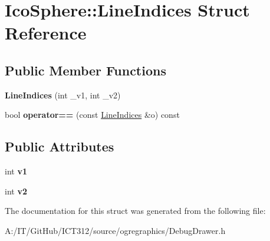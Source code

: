 \hypertarget{struct_ico_sphere_1_1_line_indices}{\section{Ico\-Sphere\-:\-:Line\-Indices Struct Reference}
\label{struct_ico_sphere_1_1_line_indices}
}
\subsection*{Public Member Functions}
\begin{DoxyCompactItemize}
\item 
\hypertarget{struct_ico_sphere_1_1_line_indices_a5cac383947767b253f73b4ab8b25c4dc}{{\bfseries Line\-Indices} (int \-\_\-v1, int \-\_\-v2)}\label{struct_ico_sphere_1_1_line_indices_a5cac383947767b253f73b4ab8b25c4dc}

\item 
\hypertarget{struct_ico_sphere_1_1_line_indices_a76d97906bf0d50d9ddde77ee8733e0cd}{bool {\bfseries operator==} (const \hyperlink{struct_ico_sphere_1_1_line_indices}{Line\-Indices} \&o) const }\label{struct_ico_sphere_1_1_line_indices_a76d97906bf0d50d9ddde77ee8733e0cd}

\end{DoxyCompactItemize}
\subsection*{Public Attributes}
\begin{DoxyCompactItemize}
\item 
\hypertarget{struct_ico_sphere_1_1_line_indices_a6219c7f06a18aed1ce313af1d8286332}{int {\bfseries v1}}\label{struct_ico_sphere_1_1_line_indices_a6219c7f06a18aed1ce313af1d8286332}

\item 
\hypertarget{struct_ico_sphere_1_1_line_indices_a11e13c571b863b879f212987c831e1ce}{int {\bfseries v2}}\label{struct_ico_sphere_1_1_line_indices_a11e13c571b863b879f212987c831e1ce}

\end{DoxyCompactItemize}


The documentation for this struct was generated from the following file\-:\begin{DoxyCompactItemize}
\item 
A\-:/\-I\-T/\-Git\-Hub/\-I\-C\-T312/source/ogregraphics/Debug\-Drawer.\-h\end{DoxyCompactItemize}
